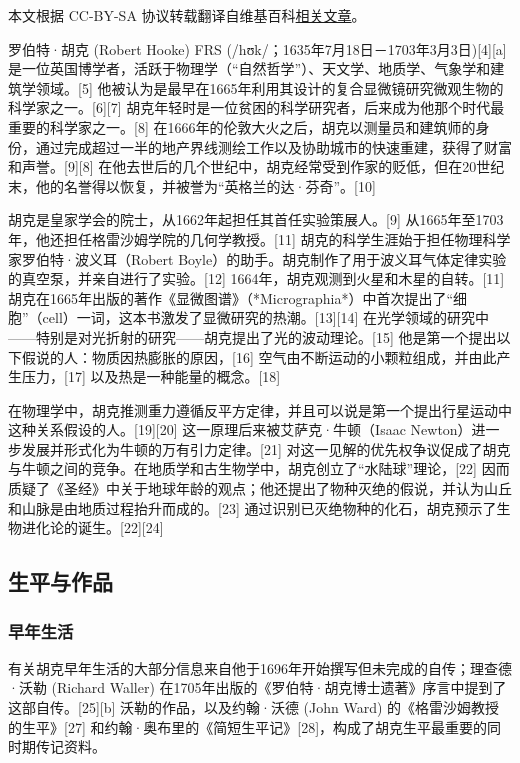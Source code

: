 
本文根据 CC-BY-SA 协议转载翻译自维基百科\href{https://en.wikipedia.org/wiki/Robert_Hooke}{相关文章}。

罗伯特·胡克 (Robert Hooke) FRS (/hʊk/；1635年7月18日－1703年3月3日)[4][a] 是一位英国博学者，活跃于物理学（“自然哲学”）、天文学、地质学、气象学和建筑学领域。[5] 他被认为是最早在1665年利用其设计的复合显微镜研究微观生物的科学家之一。[6][7] 胡克年轻时是一位贫困的科学研究者，后来成为他那个时代最重要的科学家之一。[8] 在1666年的伦敦大火之后，胡克以测量员和建筑师的身份，通过完成超过一半的地产界线测绘工作以及协助城市的快速重建，获得了财富和声誉。[9][8] 在他去世后的几个世纪中，胡克经常受到作家的贬低，但在20世纪末，他的名誉得以恢复，并被誉为“英格兰的达·芬奇”。[10]

胡克是皇家学会的院士，从1662年起担任其首任实验策展人。[9] 从1665年至1703年，他还担任格雷沙姆学院的几何学教授。[11] 胡克的科学生涯始于担任物理科学家罗伯特·波义耳（Robert Boyle）的助手。胡克制作了用于波义耳气体定律实验的真空泵，并亲自进行了实验。[12] 1664年，胡克观测到火星和木星的自转。[11] 胡克在1665年出版的著作《显微图谱》（*Micrographia*）中首次提出了“细胞”（cell）一词，这本书激发了显微研究的热潮。[13][14] 在光学领域的研究中——特别是对光折射的研究——胡克提出了光的波动理论。[15] 他是第一个提出以下假说的人：物质因热膨胀的原因，[16] 空气由不断运动的小颗粒组成，并由此产生压力，[17] 以及热是一种能量的概念。[18]

在物理学中，胡克推测重力遵循反平方定律，并且可以说是第一个提出行星运动中这种关系假设的人。[19][20] 这一原理后来被艾萨克·牛顿（Isaac Newton）进一步发展并形式化为牛顿的万有引力定律。[21] 对这一见解的优先权争议促成了胡克与牛顿之间的竞争。在地质学和古生物学中，胡克创立了“水陆球”理论，[22] 因而质疑了《圣经》中关于地球年龄的观点；他还提出了物种灭绝的假说，并认为山丘和山脉是由地质过程抬升而成的。[23] 通过识别已灭绝物种的化石，胡克预示了生物进化论的诞生。[22][24]
\subsection{生平与作品}
\subsubsection{早年生活}  
有关胡克早年生活的大部分信息来自他于1696年开始撰写但未完成的自传；理查德·沃勒 (Richard Waller) 在1705年出版的《罗伯特·胡克博士遗著》序言中提到了这部自传。[25][b] 沃勒的作品，以及约翰·沃德 (John Ward) 的《格雷沙姆教授的生平》[27] 和约翰·奥布里的《简短生平记》[28]，构成了胡克生平最重要的同时期传记资料。

